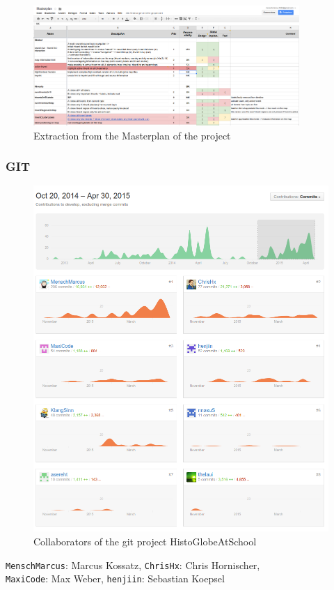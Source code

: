 \begin{figure}[H]
  \begin{center}
    \includegraphics[width=0.9\textwidth]{graphics/Masterplan.png}
  \end{center}
  \caption{Extraction from the Masterplan of the project}
  \label{fig:masterplan}
\end{figure}


\subsubsection{GIT } %
\label{ssub:git_}

\begin{figure}[H]
  \begin{center}
    \includegraphics[width=1\textwidth]{graphics/git.png}
  \end{center}
  \caption{Collaborators of the git project HistoGlobeAtSchool}
  \label{fig:git}
\end{figure}

\begin{center}
\begin{small}
  \texttt{MenschMarcus}: Marcus Kossatz, \texttt{ChrisHx}: Chris Hornischer, \\
  \texttt{MaxiCode}: Max Weber, \texttt{henjiin}: Sebastian Koepsel
\end{small}
\end{center}

